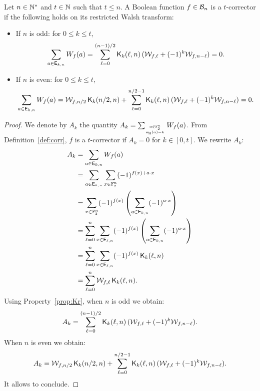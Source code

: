 \documentclass[11pt]{llncs}
\begin{document}
\begin{proposition}\label{prop:WalsCorr}
	Let $n\in \mathbb{N}^*$ and $t\in \mathbb{N}$ such that $t\le n$. A Boolean function $f\in \mathcal{B}_{n}$ is a $t$-corrector if the following holds on its restricted Walsh transform:
	\begin{itemize}
		\item If $n$ is odd: for $0\le k \le t$,
		\[\sum_{a\in \mathsf{E}_{k,n}} W_{f}(a)=\sum_{\ell=0}^{(n-1)/2} \mathsf{K}_{k}(\ell,n) \, ( \mathcal{W}_{f,\ell} + (-1)^k \mathcal{W}_{f,n-\ell})=0.\]
	\item If $n$ is even: for $0\le k \le t$,
		\[\sum_{a\in \mathsf{E}_{k,n}} W_{f}(a)=\mathcal{W}_{f,n/2} \, \mathsf{K}_{k}(n/2,n)+ \sum_{\ell=0}^{n/2-1} \mathsf{K}_{k}(\ell,n) \, ( \mathcal{W}_{f,\ell} + (-1)^k \mathcal{W}_{f,n-\ell})=0.\]
	\end{itemize}




\end{proposition}
\begin{proof}

We denote by $A_k$ the quantity $A_k=\sum_{a\in \mathbb{F}_2^n \atop{\mathsf{w_H}(a)=k}} W_{f}(a)$.
From Definition~\ref{def:corr}, $f$ is a $t$-corrector if $A_k=0$ for $k\in [0,t]$.
We rewrite $A_k$:
\begin{align*}
A_k&=\sum_{a\in \mathsf{E}_{k,n}} W_{f}(a)\\
&=\sum_{a\in \mathsf{E}_{k,n}} \sum_{x\in \mathbb{F}_2^n} (-1)^{f(x)+a \cdot x}\\
&= \sum_{x\in \mathbb{F}_2^n} (-1)^{f(x)}  \left(\sum_{a\in \mathsf{E}_{k,n}}(-1)^{a \cdot x}\right)\\
&=\sum_{\ell=0}^{n} \sum_{x\in \mathsf{E}_{\ell,n}} (-1)^{f(x)}  \left(\sum_{a\in \mathsf{E}_{k,n}}(-1)^{a \cdot x}\right)\\
&=\sum_{\ell=0}^{n} \sum_{x\in \mathsf{E}_{\ell,n}} (-1)^{f(x)} \,  \mathsf{K}_{k}(\ell,n)\\
&=\sum_{\ell=0}^{n} \mathcal{W}_{f,\ell} \, \mathsf{K}_{k}(\ell,n).
\end{align*}
Using Property~\ref{prop:Kr}, when $n$ is odd we obtain:
\[A_k=\sum_{\ell=0}^{(n-1)/2} \mathsf{K}_{k}(\ell,n) \, ( \mathcal{W}_{f,\ell} + (-1)^k \mathcal{W}_{f,n-\ell}). \]
When $n$ is even we obtain:
\[A_k=\mathcal{W}_{f,n/2} \, \mathsf{K}_{k}(n/2,n)+ \sum_{\ell=0}^{n/2-1} \mathsf{K}_{k}(\ell,n) \, ( \mathcal{W}_{f,\ell} + (-1)^k \mathcal{W}_{f,n-\ell}). \]
It allows to conclude.

\end{proof}




\end{document}
